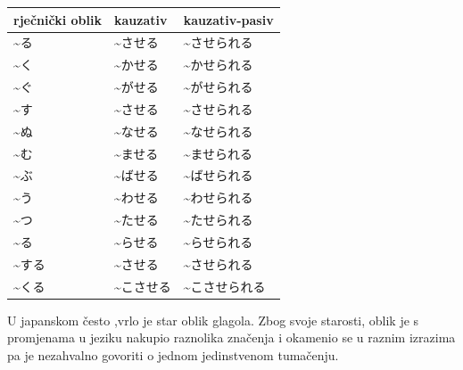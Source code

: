 	\begin{table}[h]
		\centering
		\begin{tabular}{l | l | l}\toprule[2pt]
			rječnički oblik & kauzativ & kauzativ-pasiv\\
			\midrule
			\textasciitilde る & \textasciitilde させる & \textasciitilde させられる\\
			\textasciitilde く & \textasciitilde かせる & \textasciitilde かせられる\\
			\textasciitilde ぐ & \textasciitilde がせる & \textasciitilde がせられる\\
			\textasciitilde す & \textasciitilde させる & \textasciitilde させられる\\
			\textasciitilde ぬ & \textasciitilde なせる & \textasciitilde なせられる\\
			\textasciitilde む & \textasciitilde ませる & \textasciitilde ませられる\\
			\textasciitilde ぶ & \textasciitilde ばせる & \textasciitilde ばせられる\\
			\textasciitilde う & \textasciitilde わせる & \textasciitilde わせられる\\
			\textasciitilde つ & \textasciitilde たせる & \textasciitilde たせられる\\
			\textasciitilde る & \textasciitilde らせる & \textasciitilde らせられる\\
			\textasciitilde する　& \textasciitilde させる & \textasciitilde させられる\\
			\textasciitilde くる　&\textasciitilde こさせる & \textasciitilde こさせられる\\
			\bottomrule[2pt]
		\end{tabular}
	\end{table}

	
\newpage
{}

	
	U japanskom često ,\footnotemark[1] vrlo je star oblik glagola.
	Zbog svoje starosti, oblik je s promjenama u jeziku nakupio raznolika značenja i okamenio se u raznim izrazima pa je nezahvalno govoriti o jednom jedinstvenom tumačenju.
	
	

